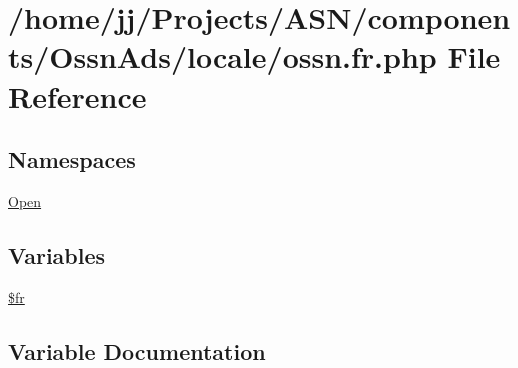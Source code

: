 \hypertarget{components_2_ossn_ads_2locale_2ossn_8fr_8php}{}\section{/home/jj/\+Projects/\+A\+S\+N/components/\+Ossn\+Ads/locale/ossn.fr.\+php File Reference}
\label{components_2_ossn_ads_2locale_2ossn_8fr_8php}
\subsection*{Namespaces}
\begin{DoxyCompactItemize}
\item 
 \hyperlink{namespace_open}{Open}
\end{DoxyCompactItemize}
\subsection*{Variables}
\begin{DoxyCompactItemize}
\item 
\hyperlink{components_2_ossn_ads_2locale_2ossn_8fr_8php_ad5107c697816e7b7f89ad1b3e94e3e0e}{\$fr}
\end{DoxyCompactItemize}


\subsection{Variable Documentation}
